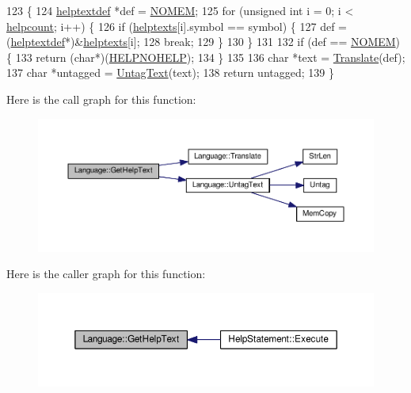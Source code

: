 \begin{DoxyCode}
123 \{
124     \hyperlink{structhelptextdef}{helptextdef} *def = \hyperlink{platform_8h_a46ff2bfbf0d44b8466a2251d5bd5e6f8}{NOMEM};
125     \textcolor{keywordflow}{for} (\textcolor{keywordtype}{unsigned} \textcolor{keywordtype}{int} i = 0; i < \hyperlink{classLanguage_a9eb566a53c9e64a9abd406a77e97d2f0}{helpcount}; i++) \{
126         \textcolor{keywordflow}{if} (\hyperlink{help_8h_acdb22c8ec8de155872a1d1e34bcc4a7f}{helptexts}[i].symbol == symbol) \{
127             def = (\hyperlink{structhelptextdef}{helptextdef}*)&\hyperlink{help_8h_acdb22c8ec8de155872a1d1e34bcc4a7f}{helptexts}[i];
128             \textcolor{keywordflow}{break};
129         \}
130     \}
131 
132     \textcolor{keywordflow}{if} (def == \hyperlink{platform_8h_a46ff2bfbf0d44b8466a2251d5bd5e6f8}{NOMEM}) \{
133         \textcolor{keywordflow}{return} (\textcolor{keywordtype}{char}*)(\hyperlink{text_8h_a45a20702609f9cc519f35b0d9358a2f3}{HELPNOHELP});
134     \}
135 
136     \textcolor{keywordtype}{char} *text = \hyperlink{classLanguage_ae4515a9a4191e57c5ccab61e99687818}{Translate}(def);
137     \textcolor{keywordtype}{char} *untagged = \hyperlink{classLanguage_a69c5b3269ec8570a2f8f28e8e632cf44}{UntagText}(text);
138     \textcolor{keywordflow}{return} untagged;
139 \}
\end{DoxyCode}


Here is the call graph for this function\+:\nopagebreak
\begin{figure}[H]
\begin{center}
\leavevmode
\includegraphics[width=350pt]{classLanguage_ad2c5b22fcacde4bbff0e3c013dce4a96_cgraph}
\end{center}
\end{figure}




Here is the caller graph for this function\+:\nopagebreak
\begin{figure}[H]
\begin{center}
\leavevmode
\includegraphics[width=350pt]{classLanguage_ad2c5b22fcacde4bbff0e3c013dce4a96_icgraph}
\end{center}
\end{figure}


